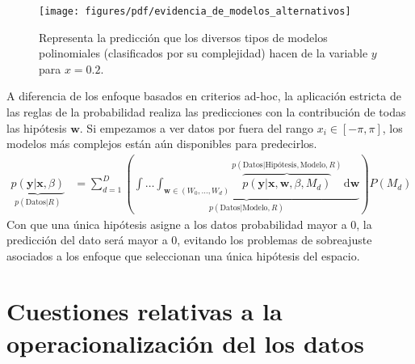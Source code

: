 \documentclass[a4paper,11pt]{book}
\theoremstyle{definition}
\begin{document}

\begin{figure}[ht!] \centering
 \texttt{[image: figures/pdf/evidencia\_de\_modelos\_alternativos]}
  \caption{Representa la predicci\'on que los diversos tipos de modelos polinomiales (clasificados por su complejidad) hacen de la variable $y$ para $x=0.2$.}
  \label{fig:balance_natural}
\end{figure}


A diferencia de los enfoque basados en criterios ad-hoc, la aplicaci\'on estricta de las reglas de la probabilidad realiza las predicciones con la contribuci\'on de todas las hip\'otesis $\bm{w}$.
%
Si empezamos a ver datos por fuera del rango $x_i \in [-\pi, \pi]$, los modelos más complejos están aún disponibles para predecirlos.
%
\begin{equation*}
\begin{split}
\underbrace{p(\bm{y}|\bm{x},\beta)}_{p(\text{Datos}|R)} & = \sum_{d=1}^D \left( \underbrace{ \int\dots\int_{\bm{w} \in (W_0, \dots, W_d)} \overbrace{p(\bm{y}|\bm{x}, \bm{w}, \beta, M_d)}^{p(\text{Datos}|\text{Hipótesis},\text{Modelo},R)} \, \text{d}\bm{w} }_{p(\text{Datos}|\text{Modelo},R)} \right) P(M_d)
\end{split}
\end{equation*}
%
Con que una \'unica hip\'otesis asigne a los datos probabilidad mayor a $0$, la predicción del dato ser\'a mayor a $0$, evitando los problemas de sobreajuste asociados a los enfoque que seleccionan una \'unica hip\'otesis del espacio.
%


\section{Cuestiones relativas a la operacionalizaci\'on del los datos} \label{sec:base_empirica_metodo}
\end{document}
